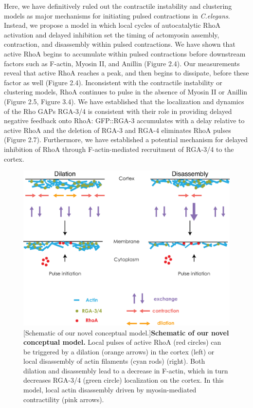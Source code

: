 \documentclass{ucetd}
\begin{document}
Here, we have definitively ruled out the contractile instability and clustering models as major mechanisms for initiating pulsed contractions in \textit{C.elegans}.  Instead, we propose a model in which local cycles of autocatalytic RhoA activation and delayed inhibition set the timing of actomyosin assembly, contraction, and disassembly within pulsed contractions.  We have shown that active RhoA begins to accumulate within pulsed contractions before downstream factors such as F-actin, Myosin II, and Anillin (Figure 2.4).  Our measurements reveal that active RhoA reaches a peak, and then begins to dissipate, before these factor as well (Figure 2.4).  Inconsistent with the contractile instability or clustering models, RhoA continues to pulse in the absence of Myosin II or Anillin (Figure 2.5, Figure 3.4).  We have established that the localization and dynamics of the Rho GAPs RGA-3/4 is consistent with their role in providing delayed negative feedback onto RhoA: GFP::RGA-3 accumulates with a delay relative to active RhoA and the deletion of RGA-3 and RGA-4 eliminates RhoA pulses (Figure 2.7).  Furthermore, we have established a potential mechanism for delayed inhibition of RhoA through F-actin-mediated recruitment of RGA-3/4 to the cortex.


\begin{figure}[!htbp]
\centering
\includegraphics[width=\textwidth]{Figure4-1}
[Schematic of our novel conceptual model.]{\textbf{Schematic of our novel conceptual model.} Local pulses of active RhoA (red circles) can be triggered by a dilation (orange arrows) in the cortex (left) or local disassembly of actin filaments (cyan rods) (right).  Both dilation and disassembly lead to a decrease in F-actin, which in turn decreases RGA-3/4 (green circle) localization on the cortex.  In this model, local actin disassembly driven by myosin-mediated contractility (pink arrows).}
\end{figure}
\end{document}
